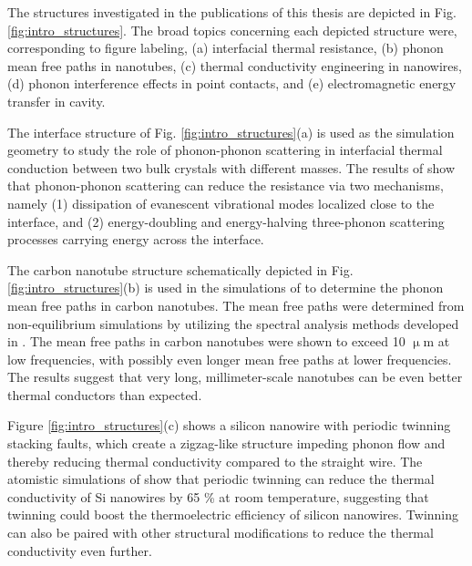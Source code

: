 The structures investigated in the publications of this thesis are depicted in Fig. \ref{fig:intro_structures}. The broad topics concerning each depicted structure were, corresponding to figure labeling, (a) interfacial thermal resistance, (b) phonon mean free paths in nanotubes, (c) thermal conductivity engineering in nanowires, (d) phonon interference effects in point contacts, and (e) electromagnetic energy transfer in cavity. %

The interface structure of Fig. \ref{fig:intro_structures}(a) is used as the simulation geometry to study the role of phonon-phonon scattering in interfacial thermal conduction between two bulk crystals with different masses. The results of  show that phonon-phonon scattering can reduce the resistance via two mechanisms, namely (1) dissipation of evanescent vibrational modes localized close to the interface, and (2) energy-doubling and energy-halving three-phonon scattering processes carrying energy across the interface.  %

The carbon nanotube structure schematically depicted in Fig. \ref{fig:intro_structures}(b) is used in the simulations of  to determine the phonon mean free paths in carbon nanotubes. The mean free paths were determined from non-equilibrium simulations by utilizing the spectral analysis methods developed in . The mean free paths in carbon nanotubes were shown to exceed 10 $\upmu$m at low frequencies, with possibly even longer mean free paths at lower frequencies. The results suggest that very long, millimeter-scale nanotubes can be even better thermal conductors than expected. %
 
Figure \ref{fig:intro_structures}(c) shows a silicon nanowire with periodic twinning stacking faults, which create a zigzag-like structure impeding phonon flow and thereby reducing thermal conductivity compared to the straight wire. The atomistic simulations of  show that periodic twinning can reduce the thermal conductivity of Si nanowires by 65 \% at room temperature, suggesting that twinning could boost the thermoelectric efficiency of silicon nanowires. Twinning can also be paired with other structural modifications to reduce the thermal conductivity even further.

